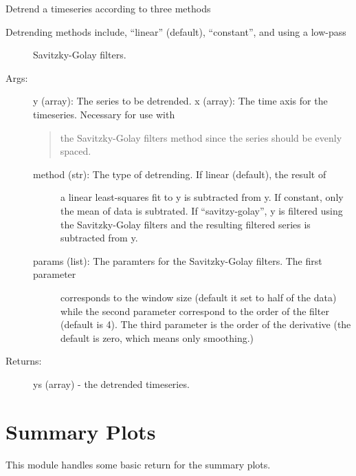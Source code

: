 \documentclass[letterpaper,10pt,english]{sphinxmanual}
\begin{document}
\begin{fulllineitems}
\label{\detokenize{Timeseries:pyleoclim.Timeseries.detrend}}
Detrend a timeseries according to three methods
\begin{description}
\item[{Detrending methods include, “linear” (default), “constant”, and using a low-pass}] \leavevmode
Savitzky-Golay filters.

\item[{Args:}] \leavevmode
y (array): The series to be detrended.
x (array): The time axis for the timeseries. Necessary for use with
\begin{quote}

the Savitzky-Golay filters method since the series should be evenly spaced.
\end{quote}
\begin{description}
\item[{method (str): The type of detrending. If linear (default), the result of}] \leavevmode
a linear least-squares fit to y is subtracted from y. If constant,
only the mean of data is subtrated. If “savitzy-golay”, y is filtered
using the Savitzky-Golay filters and the resulting filtered series
is subtracted from y.

\item[{params (list): The paramters for the Savitzky-Golay filters. The first parameter}] \leavevmode
corresponds to the window size (default it set to half of the data)
while the second parameter correspond to the order of the filter
(default is 4). The third parameter is the order of the derivative
(the default is zero, which means only smoothing.)

\end{description}

\item[{Returns:}] \leavevmode
ys (array) - the detrended timeseries.

\end{description}

\end{fulllineitems}



\chapter{Summary Plots}
\label{\detokenize{SummaryPlots:summary-plots}}\label{\detokenize{SummaryPlots::doc}}
This module handles some basic return for the summary plots.
\end{document}
